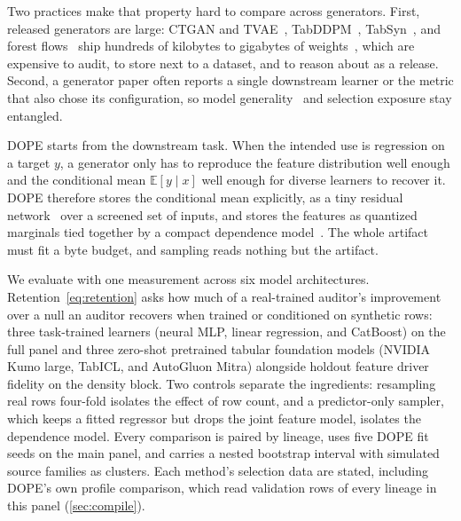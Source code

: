 \documentclass{article} %
\begin{document}
Two practices make that property hard to compare across generators. First, released generators are large: CTGAN and TVAE~\citep{xu2019ctgan}, TabDDPM~\citep{kotelnikov2023tabddpm}, TabSyn~\citep{zhang2024tabsyn}, and forest flows~\citep{jolicoeurmartineau2024forestdiffusion} ship hundreds of kilobytes to gigabytes of weights~\citep{borisov2024survey}, which are expensive to audit, to store next to a dataset, and to reason about as a release. Second, a generator paper often reports a single downstream learner or the metric that also chose its configuration, so model generality~\citep{grinsztajn2022trees,fey2025kumo} and selection exposure stay entangled.

DOPE starts from the downstream task. When the intended use is regression on a target $y$, a generator only has to reproduce the feature distribution well enough and the conditional mean $\mathbb{E}[y\mid x]$ well enough for diverse learners to recover it. DOPE therefore stores the conditional mean explicitly, as a tiny residual network~\citep{golub1973varpro} over a screened set of inputs, and stores the features as quantized marginals tied together by a compact dependence model~\citep{sklar1959}. The whole artifact must fit a byte budget, and sampling reads nothing but the artifact.

We evaluate with one measurement across six model architectures. Retention~\eqref{eq:retention} asks how much of a real-trained auditor's improvement over a null an auditor recovers when trained or conditioned on synthetic rows: three task-trained learners (neural MLP, linear regression, and CatBoost) on the full panel and three zero-shot pretrained tabular foundation models (NVIDIA Kumo large, TabICL, and AutoGluon Mitra) alongside holdout feature driver fidelity on the density block. Two controls separate the ingredients: resampling real rows four-fold isolates the effect of row count, and a predictor-only sampler, which keeps a fitted regressor but drops the joint feature model, isolates the dependence model. Every comparison is paired by lineage, uses five DOPE fit seeds on the main panel, and carries a nested bootstrap interval with simulated source families as clusters. Each method's selection data are stated, including DOPE's own profile comparison, which read validation rows of every lineage in this panel (\cref{sec:compile}).
\end{document}
